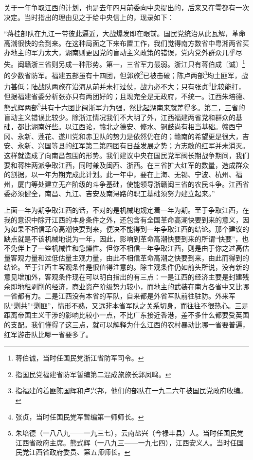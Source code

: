 \documentclass[UTF8, 12pt, a4paper]{ctexrep}
\begin{document}
关于一年争取江西的计划，也是去年四月前委向中央提出的，后来又在雩都有一次决定。当时指出的理由见之于给中央信上的，现录如下：

“蒋桂部队在九江一带彼此逼近，大战爆发即在眼前。国民党统治从此瓦解，革命高潮很快的会到来。在这种局面之下来布置工作，我们觉得南方数省中粤湘两省买办地主的军力太大，湖南则更因党的盲动主义政策的错误，党内党外群众几乎尽失。闽赣浙三省则另成一种形势。第一，三省军力最弱。浙江只有蒋伯成〔诚〕\footnote{蒋伯诚，当时任国民党浙江省防军司令。}的少数省防军。福建五部虽有十四团，但郭旅\footnote{指国民党福建省防军暂编第二混成旅旅长郭凤鸣。}已被击破；陈卢两部\footnote{指福建的着匪陈国辉和卢兴邦，他们的部队在一九二六年被国民党政府收编。}均土匪军，战力甚低；陆战队两旅在沿海从前并未打过仗，战力必不大；只有张贞\footnote{张贞，当时任国民党军暂编第一师师长。}比较能打，但据福建省委分析张亦只有两团好的；且现完全是无政府，不统一。江西朱培德、熊式辉两部\footnote{朱培德（一八八九——一九三七），云南盐兴（今禄丰县）人。当时任国民党江西省政府主席。熊式辉（一八九三——一九七四），江西安义人。当时任国民党江西省政府委员、第五师师长。}共有十六团比闽浙军力为强，然比起湖南来就差得多。第二，三省的盲动主义错误比较少。除浙江情况我们不大明了外，江西福建两省党和群众的基础，都比湖南好些。以江西论，赣北之德安、修水、铜鼓尚有相当基础。赣西宁冈、永新、莲花、遂川党和赤卫队的势力是依然仍在的；赣南的希望更是很大，吉安、永新、兴国等县的红军第二第四团有日益发展之势；方志敏的红军并未消灭。这样就造成了向南昌包围的形势。我们建议中央在国民党军阀长期战争期间，我们要和蒋桂两派争取江西，同时兼及闽西、浙西。在三省扩大红军的数量，造成群众的割据，以一年为期完成此计划。此一年中，要在上海、无锡、宁波、杭州、福州，厦门等处建立无产阶级的斗争基础，使能领导浙赣闽三省的农民斗争。江西省委必须健全，南昌、九江、吉安及南浔路的职工基础须努力建立起来。”

上面一年为期争取江西的话，不对的是机械地规定着一年为期。至于争取江西，在我的意识中除开江西的本身条件之外，还包含有全国革命高潮快要到来的意义，因为如果不相信革命高潮快要到来，便决不能得到一年争取江西的结论。那个建议的缺点就是不该机械地说为一年，因此，影响到革命高潮快要到来的所谓“快要”，也不免伴上了一些机械性和急燥性。但你不相信一年争取江西，则是由于你之过高估量客观力量和过低估量主观力量，由此不相信革命高潮之快要到来，由此而得到的结论。至于江西主客观条件是很值得注意的。除主观条件仍如前头所说，没有新的意见增加外，客观条件现在可以明白指出的有三点：一是江西的经济主要是封建残余即地租剥削的经济，商业资产阶级势力较小，而地主的武装在南方各省中又比哪一省都有力。二是江西没有本省的军队，自来都是外省军队前往驻防。外来军队“剿共”“剿匪”，情形不熟，又远非本省军队之关系切身，而往往不很热心。三是距离帝国主义干涉的影响比较小一点，不比广东接近香港，差不多什么都要受英国的支配。我们懂得了这三点，就可以解释为什么江西的农村暴动比哪一省要普遍，红军游击队比哪一省要多了。
\end{document}
